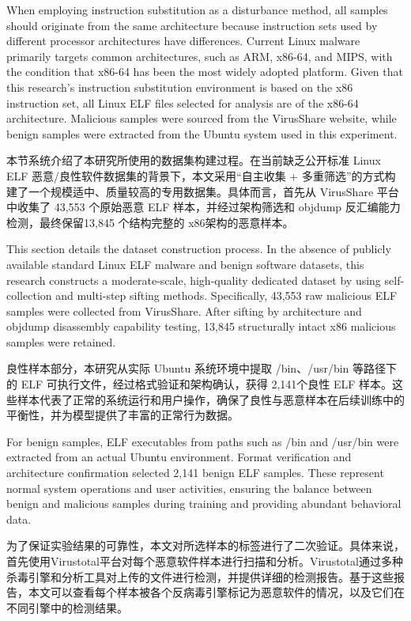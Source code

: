 When employing instruction substitution as a disturbance method, all samples should originate from the same architecture because instruction sets used by different processor architectures have differences. Current Linux malware primarily targets common architectures, such as ARM, x86-64, and MIPS, with the condition that x86-64 has been the most widely adopted platform. Given that this research's instruction substitution environment is based on the x86 instruction set, all Linux ELF files selected for analysis are of the x86-64 architecture. Malicious samples were sourced from the VirusShare website, while benign samples were extracted from the Ubuntu system used in this experiment.

本节系统介绍了本研究所使用的数据集构建过程。在当前缺乏公开标准 Linux ELF 恶意/良性软件数据集的背景下，本文采用“自主收集 + 多重筛选”的方式构建了一个规模适中、质量较高的专用数据集。具体而言，首先从 VirusShare 平台中收集了 43,553 个原始恶意 ELF 样本，并经过架构筛选和 objdump 反汇编能力检测，最终保留13,845 个结构完整的 x86架构的恶意样本。

This section details the dataset construction process. In the absence of publicly available standard Linux ELF malware and benign software datasets, this research constructs a moderate-scale, high-quality dedicated dataset by using self-collection and multi-step sifting methods. Specifically, 43,553 raw malicious ELF samples were collected from VirusShare. After sifting by architecture and objdump disassembly capability testing, 13,845 structurally intact x86 malicious samples were retained.

良性样本部分，本研究从实际 Ubuntu 系统环境中提取 /bin、/usr/bin 等路径下的 ELF 可执行文件，经过格式验证和架构确认，获得 2,141个良性 ELF 样本。这些样本代表了正常的系统运行和用户操作，确保了良性与恶意样本在后续训练中的平衡性，并为模型提供了丰富的正常行为数据。

For benign samples, ELF executables from paths such as /bin and /usr/bin were extracted from an actual Ubuntu environment. Format verification and architecture confirmation selected 2,141 benign ELF samples. These represent normal system operations and user activities, ensuring the balance between benign and malicious samples during training and providing abundant behavioral data.

为了保证实验结果的可靠性，本文对所选样本的标签进行了二次验证。具体来说，首先使用Virustotal平台对每个恶意软件样本进行扫描和分析。Virustotal通过多种杀毒引擎和分析工具对上传的文件进行检测，并提供详细的检测报告。基于这些报告，本文可以查看每个样本被各个反病毒引擎标记为恶意软件的情况，以及它们在不同引擎中的检测结果。

